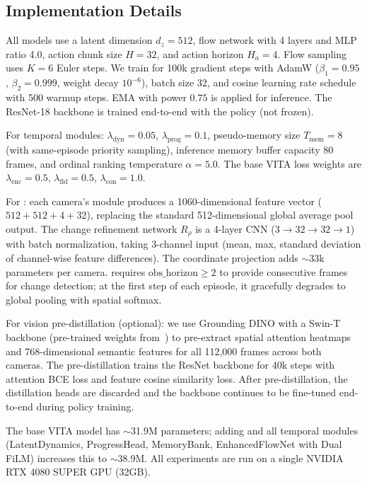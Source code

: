 \subsection{Implementation Details}
\label{sec:impl_details}

All models use a latent dimension $d_z = 512$, flow network with 4 layers and MLP ratio 4.0, action chunk size $H = 32$, and action horizon $H_a = 4$. Flow sampling uses $K = 6$ Euler steps. We train for 100k gradient steps with AdamW ($\beta_1 = 0.95$, $\beta_2 = 0.999$, weight decay $10^{-6}$), batch size 32, and cosine learning rate schedule with 500 warmup steps. EMA with power $0.75$ is applied for inference. The ResNet-18 backbone is trained end-to-end with the policy (not frozen).

For temporal modules: $\lambda_{\text{dyn}} = 0.05$, $\lambda_{\text{prog}} = 0.1$, pseudo-memory size $T_{\text{mem}} = 8$ (with same-episode priority sampling), inference memory buffer capacity 80 frames, and ordinal ranking temperature $\alpha = 5.0$. The base VITA loss weights are $\lambda_{\text{enc}} = 0.5$, $\lambda_{\text{fld}} = 0.5$, $\lambda_{\text{con}} = 1.0$.

For \fasa{}: each camera's \fasa{} module produces a 1060-dimensional feature vector ($512 + 512 + 4 + 32$), replacing the standard 512-dimensional global average pool output. The change refinement network $R_\rho$ is a 4-layer CNN ($3 \to 32 \to 32 \to 1$) with batch normalization, taking 3-channel input (mean, max, standard deviation of channel-wise feature differences). The coordinate projection adds $\sim$33k parameters per camera. \fasa{} requires $\text{obs\_horizon} \geq 2$ to provide consecutive frames for change detection; at the first step of each episode, it gracefully degrades to global pooling with spatial softmax.

For vision pre-distillation (optional): we use Grounding DINO with a Swin-T backbone (pre-trained weights from~\cite{liu2023grounding}) to pre-extract spatial attention heatmaps and 768-dimensional semantic features for all 112,000 frames across both cameras. The pre-distillation trains the ResNet backbone for 40k steps with attention BCE loss and feature cosine similarity loss. After pre-distillation, the distillation heads are discarded and the backbone continues to be fine-tuned end-to-end during policy training.

The base VITA model has $\sim$31.9M parameters; adding \fasa{} and all temporal modules (LatentDynamics, ProgressHead, MemoryBank, EnhancedFlowNet with Dual FiLM) increases this to $\sim$38.9M. All experiments are run on a single NVIDIA RTX 4080 SUPER GPU (32GB).

